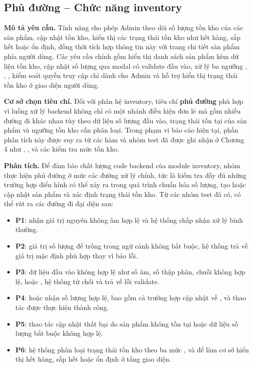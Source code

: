 \subsection{Phủ đường -- Chức năng inventory}
\textbf{Mô tả yêu cầu.} Tính năng  cho phép Admin theo dõi số lượng tồn kho của các sản phẩm, cập nhật tồn kho, hiển thị các trạng thái tồn kho như hết hàng, sắp hết hoặc ổn định, đồng thời tích hợp thông tin này với trang chi tiết sản phẩm phía người dùng. Các yêu cầu chính gồm hiển thị danh sách sản phẩm kèm dữ liệu tồn kho, cập nhật số lượng qua modal có validate đầu vào, xử lý ba ngưỡng , , , kiểm soát quyền truy cập chỉ dành cho Admin và hỗ trợ hiển thị trạng thái tồn kho ở giao diện người dùng.

\textbf{Cơ sở chọn tiêu chí.} Đối với phân hệ inventory, tiêu chí \textbf{phủ đường} phù hợp vì luồng xử lý backend không chỉ có một nhánh điều kiện đơn lẻ mà gồm nhiều đường đi khác nhau tùy theo dữ liệu số lượng đầu vào, trạng thái tồn tại của sản phẩm và ngưỡng tồn kho cần phân loại. Trong phạm vi báo cáo hiện tại, phần phân tích này được suy ra từ các hàm và nhóm test đã được ghi nhận ở Chương 4 như , ,  và các kiểm tra mức tồn kho.

\textbf{Phân tích.} Để đảm bảo chất lượng code backend của module inventory, nhóm thực hiện phủ đường ở mức các đường xử lý chính, tức là kiểm tra đầy đủ những trường hợp điển hình có thể xảy ra trong quá trình chuẩn hóa số lượng, tạo hoặc cập nhật sản phẩm và xác định trạng thái tồn kho. Từ các nhóm test đã có, có thể rút ra các đường đi đại diện sau:

\begin{itemize}
	\item \textbf{P1}:  nhận giá trị nguyên không âm hợp lệ và hệ thống chấp nhận xử lý bình thường.
	\item \textbf{P2}: giá trị số lượng để trống trong ngữ cảnh không bắt buộc, hệ thống trả về giá trị mặc định phù hợp thay vì báo lỗi.
	\item \textbf{P3}: dữ liệu đầu vào không hợp lệ như số âm, số thập phân, chuỗi không hợp lệ,  hoặc , hệ thống từ chối và trả về lỗi validate.
	\item \textbf{P4}:  hoặc  nhận số lượng hợp lệ, bao gồm cả trường hợp cập nhật về , và thao tác được thực hiện thành công.
	\item \textbf{P5}: thao tác cập nhật thất bại do sản phẩm không tồn tại hoặc dữ liệu số lượng bắt buộc không hợp lệ.
	\item \textbf{P6}: hệ thống phân loại trạng thái tồn kho theo ba mức ,  và  để làm cơ sở hiển thị hết hàng, sắp hết hoặc ổn định ở tầng giao diện.
\end{itemize}

